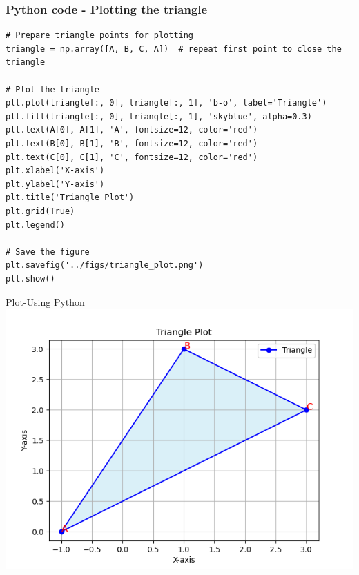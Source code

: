 \documentclass{beamer}
\begin{document}
\begin{frame}[fragile]                            
\frametitle{Python code - Plotting the triangle}                
\begin{lstlisting}
# Prepare triangle points for plotting
triangle = np.array([A, B, C, A])  # repeat first point to close the triangle

# Plot the triangle
plt.plot(triangle[:, 0], triangle[:, 1], 'b-o', label='Triangle')
plt.fill(triangle[:, 0], triangle[:, 1], 'skyblue', alpha=0.3)
plt.text(A[0], A[1], 'A', fontsize=12, color='red')
plt.text(B[0], B[1], 'B', fontsize=12, color='red')
plt.text(C[0], C[1], 'C', fontsize=12, color='red')
plt.xlabel('X-axis')
plt.ylabel('Y-axis')
plt.title('Triangle Plot')
plt.grid(True)
plt.legend()

# Save the figure
plt.savefig('../figs/triangle_plot.png')
plt.show()
\end{lstlisting}
\end{frame}
\begin{frame}{Plot-Using  Python}
    \centering
    \includegraphics[width=\columnwidth, height=0.8\textheight, keepaspectratio]{../figs/triangle_plot.png}     
\end{frame}
\end{document}
